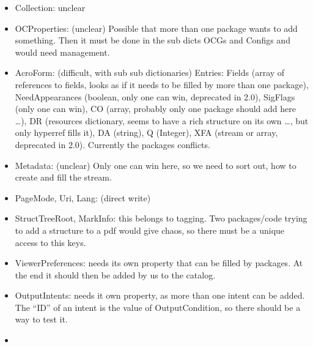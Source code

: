 \documentclass{article}
\begin{document}
\begin{itemize}
 \item Collection: unclear
 \item OCProperties: (unclear) Possible that more than one package wants to add something. Then it must be done in the sub dicts OCGs and Configs and would need management.
 \item AcroForm: (difficult, with sub sub dictionaries) Entries: Fields (array of references to fields, looks as if it needs to be filled by more than one package), NeedAppearances (boolean, only one can win, deprecated in 2.0), SigFlags (only one can win), CO (array, probably only one package should add here \ldots), DR (resources dictionary, seems to have a rich structure on its own \ldots, but only hyperref fills it), DA (string), Q (Integer), XFA (stream or array, deprecated in 2.0).
     Currently the packages conflicts. 

 \item Metadata: (unclear) Only one can win here, so we need to sort out, how to create and fill the stream.
 \item PageMode, Uri, Lang: (direct write)
 \item StructTreeRoot, MarkInfo: this belongs to tagging. Two packages/code trying to add a structure to a pdf would give chaos, so there must be a unique access to this keys.
 \item ViewerPreferences: needs its own property that can be filled by packages. At the end it should then be added by us to the catalog.

 \item OutputIntents: needs it own property, as more than one intent can be added. The \enquote{ID} of an intent is the value of OutputCondition, so there should be a way to test it.
\item
\end{itemize}
\end{document}
